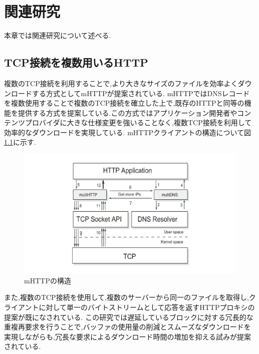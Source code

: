 \documentclass[a4j,12pt]{gradthesis_utf8}
\begin{document}
\chapter{関連研究}\label{sec:sec2}
本章では関連研究について述べる.

\section{TCP接続を複数用いるHTTP}
複数のTCP接続を利用することで,より大きなサイズのファイルを効率よくダウンロードする方式としてmHTTP\cite{mhttp}が提案されている.
mHTTPではDNSレコードを複数使用することで複数のTCP接続を確立した上で,既存のHTTPと同等の機能を提供する方式を提案している.この方式ではアプリケーション開発者やコンテンツプロバイダに大きな仕様変更を強いることなく,複数TCP接続を利用して効率的なダウンロードを実現している.
mHTTPクライアントの構造について図\ref{mhttp}に示す.

\begin{figure}[ht]
	\centering
	\includegraphics[width=16cm]{figure/mhttp.pdf}
	\caption{mHTTPの構造}
	\label{mhttp}
\end{figure}

\newpage

また,複数のTCP接続を使用して,複数のサーバーから同一のファイルを取得し,クライアントに対して単一のバイトストリームとして応答を返すHTTPプロキシの提案が既になされている.\cite{proxy}
この研究では遅延しているブロックに対する冗長的な重複再要求を行うことで,バッファの使用量の削減とスムーズなダウンロードを実現しながらも,冗長な要求によるダウンロード時間の増加を抑える試みが提案されている.
\end{document}
